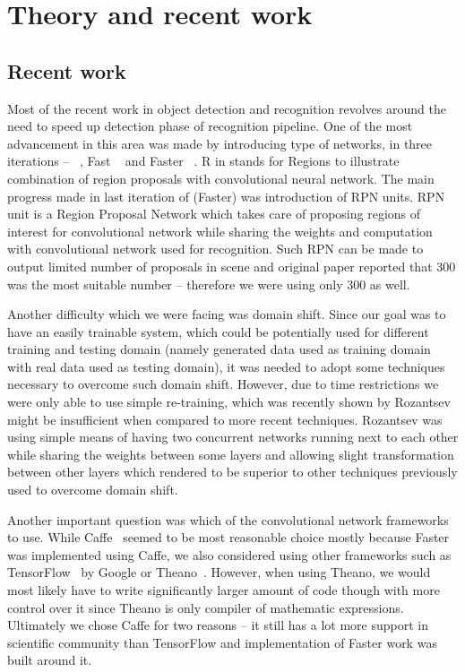 \chapter{Theory and recent work}

\section{Recent work}

Most of the recent work in object detection and recognition revolves around the need to speed up detection phase of recognition pipeline. One of the most advancement in this area was made by introducing \rcnn{} type of networks, in three iterations -- \rcnn~\cite{rcnn}, Fast \rcnn~\cite{fast} and Faster \rcnn~\cite{faster}. R in \rcnn{} stands for Regions to illustrate combination of region proposals with convolutional neural network. The main progress made in last iteration of \rcnn{} (Faster) was introduction of RPN units. RPN unit is a Region Proposal Network which takes care of proposing regions of interest for convolutional network while sharing the weights and computation with convolutional network used for recognition. Such RPN can be made to output limited number of proposals in scene and original paper reported that 300 was the most suitable number -- therefore we were using only 300 as well.

Another difficulty which we were facing was domain shift. Since our goal was to have an easily trainable system, which could be potentially used for different training and testing domain (namely generated data used as training domain with real data used as testing domain), it was needed to adopt some techniques necessary to overcome such domain shift. However, due to time restrictions we were only able to use simple re-training, which was recently shown by Rozantsev~\cite{shift} might be insufficient when compared to more recent techniques. Rozantsev was using simple means of having two concurrent networks running next to each other while sharing the weights between some layers and allowing slight transformation between other layers which rendered to be superior to other techniques previously used to overcome domain shift.

Another important question was which of the convolutional network frameworks to use. While Caffe~\cite{caffe} seemed to be most reasonable choice mostly because Faster \rcnn{} was implemented using Caffe, we also considered using other frameworks such as TensorFlow~\cite{tensorflow} by Google or Theano~\cite{theano}. However, when using Theano, we would most likely have to write significantly larger amount of code though with more control over it since Theano is only compiler of mathematic expressions. Ultimately we chose Caffe for two reasons -- it still has a lot more support in scientific community than TensorFlow and implementation of Faster \rcnn{} work was built around it.

